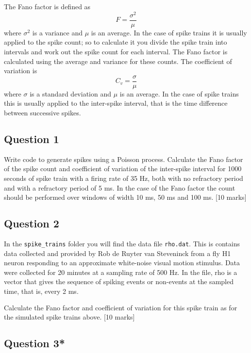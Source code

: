 \documentclass[12pt]{article}
\begin{document}
The Fano factor is defined as
\begin{equation}
F=\frac{\sigma^2}{\mu}
\end{equation}
where $\sigma^2$ is a variance and $\mu$ is an average.  In the
case of spike trains it is usually applied to the spike count; so to
calculate it you divide the spike train into intervals and work out
the spike count for each interval. The Fano factor is calculated using
the average and variance for these counts. The coefficient of variation is 
\begin{equation}
C_v=\frac{\sigma}{\mu}
\end{equation}
where $\sigma$ is a standard deviation and $\mu$ is an average. In the
case of spike trains this is usually applied to the inter-spike
interval, that is the time difference between successive spikes.

\subsection*{Question 1}

Write code to generate spikes using a Poisson process. Calculate the
Fano factor of the spike count and coefficient of variation of the
inter-spike interval for 1000 seconds of spike train with a firing
rate of 35 Hz, both with no refractory period and with a refractory
period of 5 ms. In the case of the Fano factor the count should be
performed over windows of width 10 ms, 50 ms and 100 ms. [10 marks]

\subsection*{Question 2}

In the \texttt{spike\_trains} folder you will find the data file
\texttt{rho.dat}. This is contains data collected and provided by Rob
de Ruyter van Steveninck from a fly H1 neuron responding to an
approximate white-noise visual motion stimulus. Data were collected
for 20 minutes at a sampling rate of 500 Hz. In the file, rho is a
vector that gives the sequence of spiking events or non-events at the
sampled time, that is, every 2 ms.

Calculate the Fano factor and coefficient of variation for this spike
train as for the simulated spike trains above. [10 marks]


\subsection*{Question 3*}
\end{document}
